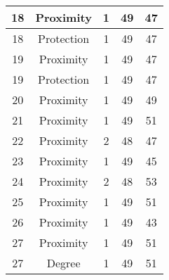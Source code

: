 \documentclass[results.tex]{subfiles}
\begin{document}
\begin{center}
\begin{tabular}{| c || c | c | c | c |}
            \hline
            18                      & Proximity                    & 1                      & 49                      & 47                   \\
            \hline
            18                      & Protection                   & 1                      & 49                      & 47                   \\
            \hline
            19                      & Proximity                    & 1                      & 49                      & 47                   \\
            \hline
            19                      & Protection                   & 1                      & 49                      & 47                   \\
            \hline
            20                      & Proximity                    & 1                      & 49                      & 49                   \\
            \hline
            21                      & Proximity                    & 1                      & 49                      & 51                   \\
            \hline
            22                      & Proximity                    & 2                      & 48                      & 47                   \\
            \hline
            23                      & Proximity                    & 1                      & 49                      & 45                   \\
            \hline
            24                      & Proximity                    & 2                      & 48                      & 53                   \\
            \hline
            25                      & Proximity                    & 1                      & 49                      & 51                   \\
            \hline
            26                      & Proximity                    & 1                      & 49                      & 43                   \\
            \hline
            27                      & Proximity                    & 1                      & 49                      & 51                   \\
            \hline
            27                      & Degree                       & 1                      & 49                      & 51                   \\

\end{tabular}
\end{center}
\end{document}
